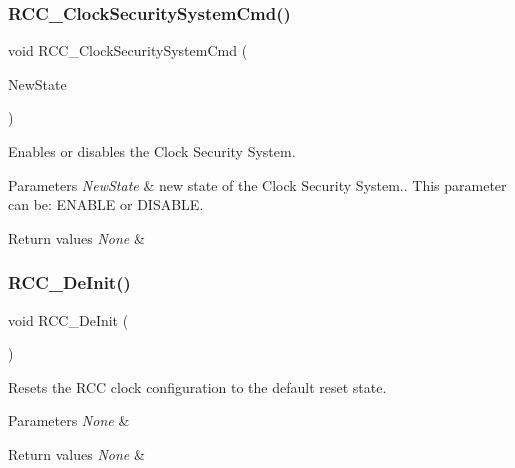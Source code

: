 \subsubsection{\texorpdfstring{RCC\_ClockSecuritySystemCmd()}{RCC\_ClockSecuritySystemCmd()}}
{\footnotesize\ttfamily void R\+C\+C\+\_\+\+Clock\+Security\+System\+Cmd (\begin{DoxyParamCaption}\item[{\mbox{\hyperlink{group___exported__types_gac9a7e9a35d2513ec15c3b537aaa4fba1}{Functional\+State}}}]{New\+State }\end{DoxyParamCaption})}



Enables or disables the Clock Security System. 


\begin{DoxyParams}{Parameters}
{\em New\+State} & new state of the Clock Security System.. This parameter can be\+: E\+N\+A\+B\+LE or D\+I\+S\+A\+B\+LE. \\
\hline
\end{DoxyParams}

\begin{DoxyRetVals}{Return values}
{\em None} & \\
\hline
\end{DoxyRetVals}
\mbox{\label{group___r_c_c___exported___functions_ga413f6422be11b1334abe60b3bff2e062}} 
\subsubsection{\texorpdfstring{RCC\_DeInit()}{RCC\_DeInit()}}
{\footnotesize\ttfamily void R\+C\+C\+\_\+\+De\+Init (\begin{DoxyParamCaption}\item[{void}]{ }\end{DoxyParamCaption})}



Resets the R\+CC clock configuration to the default reset state. 


\begin{DoxyParams}{Parameters}
{\em None} & \\
\hline
\end{DoxyParams}

\begin{DoxyRetVals}{Return values}
{\em None} & \\
\hline
\end{DoxyRetVals}
\mbox{\label{group___r_c_c___exported___functions_ga3e9944fd1ed734275222bbb3e3f29993}} 
